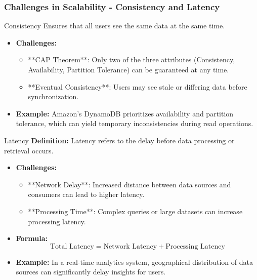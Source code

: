 \documentclass[aspectratio=169]{beamer}
\begin{document}
\begin{frame}[fragile]
    \frametitle{Challenges in Scalability - Consistency and Latency}
    \begin{block}{Consistency}
        Ensures that all users see the same data at the same time.
    \end{block}
    \begin{itemize}
        \item \textbf{Challenges:}
        \begin{itemize}
            \item **CAP Theorem**: Only two of the three attributes (Consistency, Availability, Partition Tolerance) can be guaranteed at any time.
            \item **Eventual Consistency**: Users may see stale or differing data before synchronization.
        \end{itemize}
        \item \textbf{Example:} Amazon's DynamoDB prioritizes availability and partition tolerance, which can yield temporary inconsistencies during read operations.
    \end{itemize}
    
    \begin{block}{Latency}
        \textbf{Definition:} Latency refers to the delay before data processing or retrieval occurs.
    \end{block}
    \begin{itemize}
        \item \textbf{Challenges:}
        \begin{itemize}
            \item **Network Delay**: Increased distance between data sources and consumers can lead to higher latency.
            \item **Processing Time**: Complex queries or large datasets can increase processing latency.
        \end{itemize}
        \item \textbf{Formula:} 
        \begin{equation}
        \text{Total Latency} = \text{Network Latency} + \text{Processing Latency}
        \end{equation}
        \item \textbf{Example:} In a real-time analytics system, geographical distribution of data sources can significantly delay insights for users.
    \end{itemize}
\end{frame}
\end{document}
